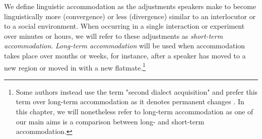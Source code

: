 \documentclass[output=paper,
modfonts
]{langscibook}
\begin{document}
We define linguistic accommodation as the adjustments speakers make to become linguistically more (convergence) or less (divergence) similar to an interlocutor or to a social environment. When occurring in a single interaction or experiment over minutes or hours, we will refer to these adjustments as \textit{short-term accommodation}. \textit{Long-term accommodation} will be used when accommodation takes place over months or weeks, for instance, after a speaker has moved to a new region or moved in with a new flatmate.\footnote{Some authors instead use the term "second dialect acquisition" \citep{siegel_second_2010} and prefer this term over long-term accommodation as it denotes permanent changes \citep{chambers_dialect_1992}. In this chapter, we will nonetheless refer to long-term accommodation as one of our main aims is a comparison between long- and short-term accommodation.} %
% 
% 
% 
% 
% 
% 
% 
%
\end{document}
